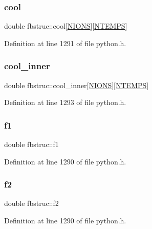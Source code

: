 \subsubsection{\texorpdfstring{cool}{cool}}
{\footnotesize\ttfamily double fbstruc\+::cool\mbox{[}\hyperlink{atomic_8h_ac6a37b9ae25d11bf2521d8ee85c46d79}{N\+I\+O\+NS}\mbox{]}\mbox{[}\hyperlink{python_8h_aed80336ab0bdf84ca8d3c4c333430a7b}{N\+T\+E\+M\+PS}\mbox{]}}



Definition at line 1291 of file python.\+h.

\mbox{\label{structfbstruc_acb616be77cf6fed83e53426144683bd5}} 
\subsubsection{\texorpdfstring{cool\+\_\+inner}{cool\_inner}}
{\footnotesize\ttfamily double fbstruc\+::cool\+\_\+inner\mbox{[}\hyperlink{atomic_8h_ac6a37b9ae25d11bf2521d8ee85c46d79}{N\+I\+O\+NS}\mbox{]}\mbox{[}\hyperlink{python_8h_aed80336ab0bdf84ca8d3c4c333430a7b}{N\+T\+E\+M\+PS}\mbox{]}}



Definition at line 1293 of file python.\+h.

\mbox{\label{structfbstruc_a00049c608d6d413ff278c4ad85c2dfdd}} 
\subsubsection{\texorpdfstring{f1}{f1}}
{\footnotesize\ttfamily double fbstruc\+::f1}



Definition at line 1290 of file python.\+h.

\mbox{\label{structfbstruc_abbce27eacdec4c677886d24a20aac51c}} 
\subsubsection{\texorpdfstring{f2}{f2}}
{\footnotesize\ttfamily double fbstruc\+::f2}



Definition at line 1290 of file python.\+h.

